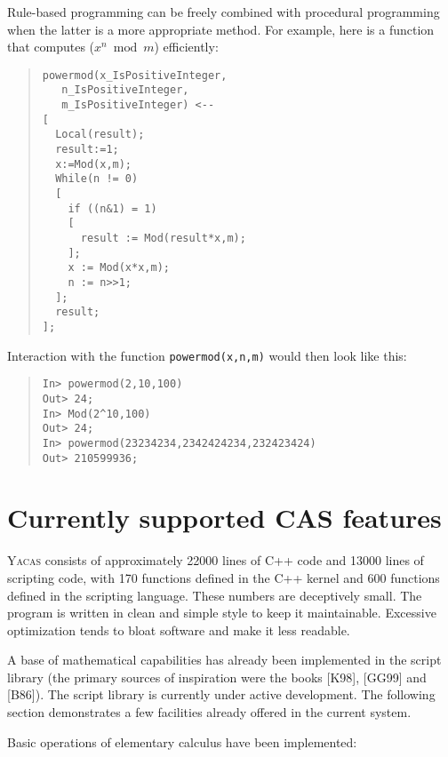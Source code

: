 \documentclass{llncs}
\begin{document}
Rule-based programming can be freely combined with procedural programming when
the latter is a more appropriate method. For example, here is a function that
computes ($x ^{n}\bmod m$) efficiently:

\begin{quote}\small\begin{verbatim}
powermod(x_IsPositiveInteger, 
   n_IsPositiveInteger,
   m_IsPositiveInteger) <--
[
  Local(result);
  result:=1;
  x:=Mod(x,m);
  While(n != 0)
  [
    if ((n&1) = 1)
	[
      result := Mod(result*x,m);
    ];
    x := Mod(x*x,m);
    n := n>>1;
  ];
  result;
];
\end{verbatim}\end{quote}

Interaction with the function \small{\texttt{powermod(x,n,m)}} would then look like this:

\begin{quote}\small\begin{verbatim}
In> powermod(2,10,100)
Out> 24;
In> Mod(2^10,100)
Out> 24;
In> powermod(23234234,2342424234,232423424)
Out> 210599936;
\end{verbatim}\end{quote}

\section{%
Currently supported CAS features}
\textsc{Yacas} consists of approximately 22000 lines of C++ code and  13000 lines of 
scripting code, with 170 functions defined in the C++ kernel and 600 functions
defined  in the scripting language. These numbers are deceptively small. The
program is written in clean and simple style to keep it maintainable. Excessive
optimization tends to bloat software and make it less readable.

A base of mathematical capabilities has already been implemented in the script
library (the primary sources of inspiration were the books [K98], [GG99] and
[B86]). The script library is currently under active development.  The
following section demonstrates a few facilities already offered in the  current
system.

Basic operations of elementary calculus have been implemented:
\end{document}
